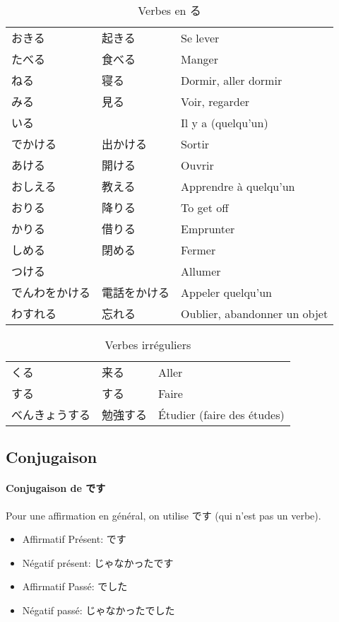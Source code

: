\documentclass[a4paper,10pt,french,openany]{memoir}
\begin{document}
\begin{table}[h]
 \centering
 \caption{Verbes en る}
 \label{tab:verbes-ru}
 \begin{tabular}{lll}
  おきる & 起きる & Se lever \\
  たべる & 食べる & Manger \\
  ねる & 寝る & Dormir, aller dormir \\
  みる & 見る & Voir, regarder \\
  いる & & Il y a (quelqu'un) \\
  でかける & 出かける & Sortir \\
  あける & 開ける & Ouvrir \\
  おしえる & 教える & Apprendre à quelqu'un \\
  おりる & 降りる & To get off \\
  かりる & 借りる & Emprunter \\
  しめる & 閉める & Fermer \\
  つける & & Allumer \\
  でんわをかける & 電話をかける & Appeler quelqu'un \\
  わすれる & 忘れる & Oublier, abandonner un objet \\
 \end{tabular}
\end{table}

\begin{table}[h]
 \centering
 \caption{Verbes irréguliers}
 \label{tab:verbes-irréguliers}
 \begin{tabular}{lll}
  くる & 来る & Aller \\
  する & する & Faire \\
  べんきょうする & 勉強する & Étudier (faire des études) \\
 \end{tabular}
\end{table}

\subsection{Conjugaison}

\paragraph{Conjugaison de です}
Pour une affirmation en général, on utilise です (qui n'est pas un verbe).
\begin{itemize}
 \item Affirmatif Présent: です
 \item Négatif présent: じゃなかったです
 \item Affirmatif Passé: でした
 \item Négatif passé: じゃなかったでした
\end{itemize}
\end{document}

